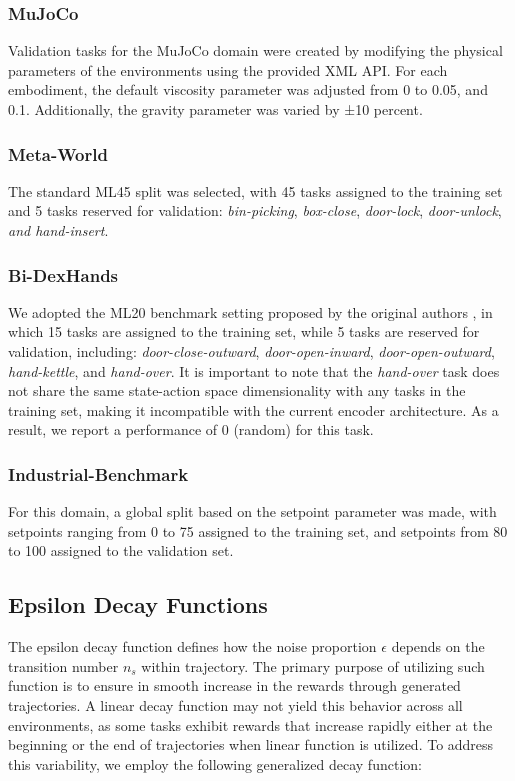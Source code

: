 \documentclass{article}
\theoremstyle{plain}
\theoremstyle{definition}
\theoremstyle{remark}
\begin{document}
\subsubsection{MuJoCo}\label{appendix:dataset:train-test-split:mujoco} Validation tasks for the MuJoCo domain were created by modifying the physical parameters of the environments using the provided XML API. For each embodiment, the default viscosity parameter was adjusted from 0 to 0.05, and 0.1. Additionally, the gravity parameter was varied by ±10 percent.

\subsubsection{Meta-World}\label{appendix:dataset:train-test-split:meta-world} The standard ML45 split was selected, with 45 tasks assigned to the training set and 5 tasks reserved for validation: \textit{bin-picking}, \textit{box-close}, \textit{door-lock}, \textit{door-unlock}, \textit{and hand-insert}.

\subsubsection{Bi-DexHands}\label{appendix:dataset:train-test-split:bidexhands} We adopted the ML20 benchmark setting proposed by the original authors \cite{chen2022humanlevelbimanualdexterousmanipulation}, in which 15 tasks are assigned to the training set, while 5 tasks are reserved for validation, including: \textit{door-close-outward}, \textit{door-open-inward}, \textit{door-open-outward}, \textit{hand-kettle}, and \textit{hand-over}. It is important to note that the \textit{hand-over} task does not share the same state-action space dimensionality with any tasks in the training set, making it incompatible with the current encoder architecture. As a result, we report a performance of 0 (random) for this task.

\subsubsection{Industrial-Benchmark}\label{appendix:dataset:train-test-split:ib} For this domain, a global split based on the setpoint parameter was made, with setpoints ranging from 0 to 75 assigned to the training set, and setpoints from 80 to 100 assigned to the validation set.

\subsection{Epsilon Decay Functions}\label{appendix:dataset:epsilon-decay}
The epsilon decay function defines how the noise proportion $\epsilon$ depends on the transition number $n_s$ within trajectory. The primary purpose of utilizing such function is to ensure in smooth increase in the rewards through generated trajectories. A linear decay function may not yield this behavior across all environments, as some tasks exhibit rewards that increase rapidly either at the beginning or the end of trajectories when linear function is utilized. To address this variability, we employ the following generalized decay function:
\end{document}
